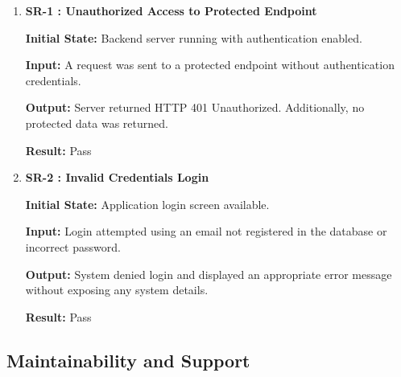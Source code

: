 \documentclass[12pt, titlepage]{article}
\begin{document}
\begin{enumerate}

\item \textbf{SR-1 : Unauthorized Access to Protected Endpoint}

\textbf{Initial State:} Backend server running with authentication enabled.

\textbf{Input:} A request was sent to a protected endpoint without authentication credentials.

\textbf{Output:} Server returned HTTP 401 Unauthorized. Additionally, no protected data was returned.

\textbf{Result:} Pass

\vspace{0.5em}

\item \textbf{SR-2 : Invalid Credentials Login}

\textbf{Initial State:} Application login screen available.

\textbf{Input:} Login attempted using an email not registered in the database or incorrect password.

\textbf{Output:} System denied login and displayed an appropriate error message without exposing any 
system details.

\textbf{Result:} Pass

\vspace{0.5em}


\end{enumerate}

\subsection{Maintainability and Support}
\end{document}
